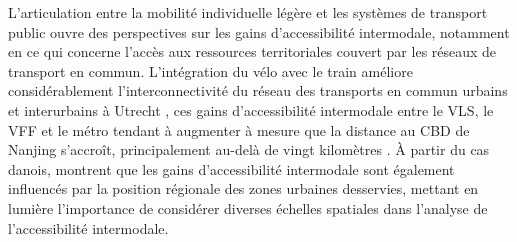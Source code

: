 \begin{refsegment}
L'articulation entre la mobilité individuelle légère et les systèmes de transport public ouvre des perspectives sur les gains d'accessibilité intermodale, notamment en ce qui concerne l'accès aux ressources territoriales couvert par les réseaux de transport en commun. L'intégration du vélo avec le train améliore considérablement l'interconnectivité du réseau des transports en commun urbains et interurbains à Utrecht \textcolor{blue}{\autocite[273]{krygsman_multimodal_2004}}, ces gains d'accessibilité intermodale entre le \acrshort{VLS}, le \acrshort{VFF} et le métro tendant à augmenter à mesure que la distance au \acrshort{CBD} de Nanjing s'accroît, principalement au-delà de vingt kilomètres \textcolor{blue}{\autocite[8]{cheng_comparison_2023}}. À partir du cas danois, \textcolor{blue}{\textcite[42]{nielsen_bikeability_2018}} montrent que les gains d'accessibilité intermodale sont également influencés par la position régionale des zones urbaines desservies, mettant en lumière l'importance de considérer diverses échelles spatiales dans l'analyse de l'accessibilité intermodale.%


\end{refsegment}
